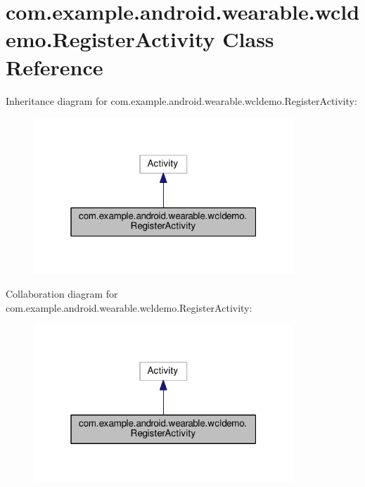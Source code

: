 \hypertarget{classcom_1_1example_1_1android_1_1wearable_1_1wcldemo_1_1RegisterActivity}{}\section{com.\+example.\+android.\+wearable.\+wcldemo.\+Register\+Activity Class Reference}
\label{classcom_1_1example_1_1android_1_1wearable_1_1wcldemo_1_1RegisterActivity}


Inheritance diagram for com.\+example.\+android.\+wearable.\+wcldemo.\+Register\+Activity\+:
\nopagebreak
\begin{figure}[H]
\begin{center}
\leavevmode
\includegraphics[width=277pt]{d9/d9b/classcom_1_1example_1_1android_1_1wearable_1_1wcldemo_1_1RegisterActivity__inherit__graph}
\end{center}
\end{figure}


Collaboration diagram for com.\+example.\+android.\+wearable.\+wcldemo.\+Register\+Activity\+:
\nopagebreak
\begin{figure}[H]
\begin{center}
\leavevmode
\includegraphics[width=277pt]{d9/dd1/classcom_1_1example_1_1android_1_1wearable_1_1wcldemo_1_1RegisterActivity__coll__graph}
\end{center}
\end{figure}
